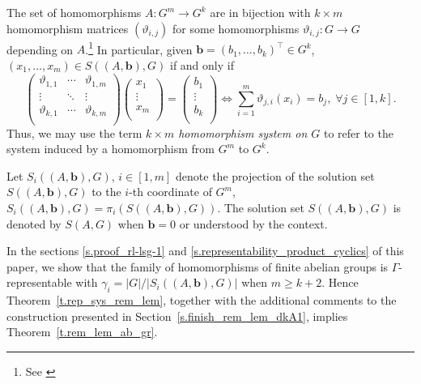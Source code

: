 \documentclass[10pt]{article}
\begin{document}
The set of homomorphisms $A:G^m\to G^k$ are in bijection with $k\times m$ homomorphism matrices $(\vartheta_{i,j})$ for some homomorphisms $\vartheta_{i,j}:G\to G$ depending on $A$.\footnote{See \cite[Section~13.10]{vandW91-2}} In particular, given $\mathbf{b}=(b_1,\ldots,b_k)^{\top}\in G^k$, $(x_1,\ldots,x_m)\in S\left(\left(A,\mathbf{b}\right),G\right)$ if and only if
\begin{displaymath}
\left(
	\begin{array}{ccc}
		\vartheta_{1,1} & \cdots & \vartheta_{1,m}  \\
		\vdots  &\ddots & \vdots \\
		\vartheta_{k,1} &  \cdots & \vartheta_{k,m} \\
		\end{array}\right)
		\left(\begin{array}{c}
		x_1 \\
		\vdots \\
			x_m \\
			\end{array}\right)	
	=	\left(\begin{array}{c}
			b_1 \\
			\vdots \\
				b_k \\
				\end{array}\right)
				\iff
\sum_{i=1}^m \vartheta_{j,i}(x_i)=b_j, \; \forall j\in [1,k].
\end{displaymath}
 Thus, we may use the term \emph{$k\times m$ homomorphism system on $G$} to refer to the system induced by a homomorphism from $G^m$ to $G^k$.

Let $S_i((A,\mathbf{b}),G)$, $i\in [1,m]$ denote the projection of the solution set $S((A,\mathbf{b}),G)$ to the $i$-th coordinate of $G^m$, $S_i((A,\mathbf{b}),G)=\pi_i(S((A,\mathbf{b}),G))$. The solution set $S((A,\mathbf{b}),G)$ is denoted by $S(A,G)$ when $\mathbf{b}=0$ or understood by the context.

In the sections \ref{s.proof_rl-lsg-1} and \ref{s.representability_product_cyclics}
of this paper, we show that the family of homomorphisms of finite abelian groups
is $\Gamma$-representable with $\gamma_i=|G|/|S_i((A,\mathbf{b}),G)|$ when $m\geq k+2$. Hence Theorem~\ref{t.rep_sys_rem_lem}, together with the additional comments to the construction presented in Section~\ref{s.finish_rem_lem_dkA1}, implies Theorem~\ref{t.rem_lem_ab_gr}.
\end{document}
